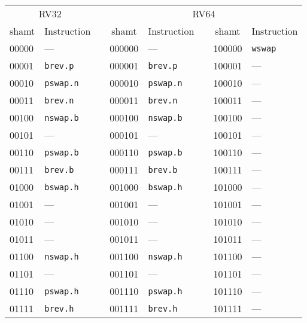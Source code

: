 \begin{table}[h]
\begin{small}
\begin{center}
\begin{tabular}{l l p{0.5in} l l p{0.3in} l l}

\multicolumn{2}{c}{RV32} & &
\multicolumn{5}{c}{RV64} \\

\cline{1-2}
\cline{4-8}

\multicolumn{1}{c}{shamt} & Instruction & &
\multicolumn{1}{c}{shamt} & Instruction & &
\multicolumn{1}{c}{shamt} & Instruction \\

\cline{1-2}
\cline{4-5}
\cline{7-8}

00000 & ---           &   &   000000 & ---           &   &   100000 & {\tt wswap} \\
00001 & {\tt brev.p}  &   &   000001 & {\tt brev.p}  &   &   100001 & ---         \\
00010 & {\tt pswap.n} &   &   000010 & {\tt pswap.n} &   &   100010 & ---         \\
00011 & {\tt brev.n}  &   &   000011 & {\tt brev.n}  &   &   100011 & ---         \\
00100 & {\tt nswap.b} &   &   000100 & {\tt nswap.b} &   &   100100 & ---         \\
00101 & ---           &   &   000101 & ---           &   &   100101 & ---         \\
00110 & {\tt pswap.b} &   &   000110 & {\tt pswap.b} &   &   100110 & ---         \\
00111 & {\tt brev.b}  &   &   000111 & {\tt brev.b}  &   &   100111 & ---         \\

\cline{1-2}
\cline{4-5}
\cline{7-8}

01000 & {\tt bswap.h} &   &   001000 & {\tt bswap.h} &   &   101000 & ---         \\
01001 & ---           &   &   001001 & ---           &   &   101001 & ---         \\
01010 & ---           &   &   001010 & ---           &   &   101010 & ---         \\
01011 & ---           &   &   001011 & ---           &   &   101011 & ---         \\
01100 & {\tt nswap.h} &   &   001100 & {\tt nswap.h} &   &   101100 & ---         \\
01101 & ---           &   &   001101 & ---           &   &   101101 & ---         \\
01110 & {\tt pswap.h} &   &   001110 & {\tt pswap.h} &   &   101110 & ---         \\
01111 & {\tt brev.h}  &   &   001111 & {\tt brev.h}  &   &   101111 & ---         \\


\end{tabular}
\end{center}
\end{small}
\end{table}
